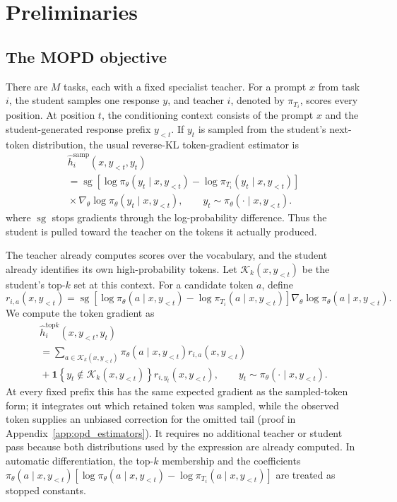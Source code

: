 \section{Preliminaries}
\label{sec:setting}

\subsection{The MOPD objective}

There are $M$ tasks, each with a fixed specialist teacher. For a prompt $x$
from task $i$, the student samples one response $y$, and teacher $i$, denoted
by $\pi_{T_i}$, scores every position. At position $t$, the conditioning
context consists of the prompt $x$ and the student-generated response prefix
$y_{<t}$. If $y_t$ is sampled from the student's next-token distribution, the
usual reverse-KL token-gradient estimator is
\begin{multline*}
    \widehat h_i^{\mathrm{samp}}(x,y_{<t},y_t)\\[-0.4em]
    =\operatorname{sg}\!\left[
        \log \pi_\theta(y_t\mid x,y_{<t})
        -\log \pi_{T_i}(y_t\mid x,y_{<t})
      \right]\\[-0.2em]
    {}\times\nabla_\theta\log \pi_\theta(y_t\mid x,y_{<t}),
    \qquad y_t\sim\pi_\theta(\cdot\mid x,y_{<t}).
\end{multline*}
where $\operatorname{sg}$ stops gradients through the log-probability
difference. Thus the student is pulled toward the teacher on the tokens it
actually produced.

The teacher already computes scores over the vocabulary, and the student
already identifies its own high-probability tokens. Let
$\mathcal K_k(x,y_{<t})$ be the student's top-$k$ set at this context. For a
candidate token $a$, define
\[
    r_{i,a}(x,y_{<t})
    =\operatorname{sg}\!\left[
        \log \pi_\theta(a\mid x,y_{<t})
        -\log \pi_{T_i}(a\mid x,y_{<t})
      \right]
      \nabla_\theta\log \pi_\theta(a\mid x,y_{<t}).
\]
We compute the token gradient as
\begin{multline*}
    \widehat h_i^{\mathrm{top}k}(x,y_{<t},y_t)\\[-0.4em]
    =\sum_{a\in\mathcal K_k(x,y_{<t})}
       \pi_\theta(a\mid x,y_{<t})r_{i,a}(x,y_{<t})\\[-0.2em]
    {}+\mathbf{1}\!\left\{y_t\notin\mathcal K_k(x,y_{<t})\right\}
       r_{i,y_t}(x,y_{<t}),
    \qquad y_t\sim\pi_\theta(\cdot\mid x,y_{<t}).
\end{multline*}
At every fixed prefix this has the same expected gradient as the sampled-token
form; it integrates out which retained token was sampled, while the observed
token supplies an unbiased correction for the omitted tail (proof in
Appendix~\ref{app:opd_estimators}). It requires no additional teacher or
student pass because both distributions used by the expression are already
computed. In automatic differentiation, the top-$k$ membership and the
coefficients
$\pi_\theta(a\mid x,y_{<t})
 [\log\pi_\theta(a\mid x,y_{<t})-\log\pi_{T_i}(a\mid x,y_{<t})]$
are treated as stopped constants.

